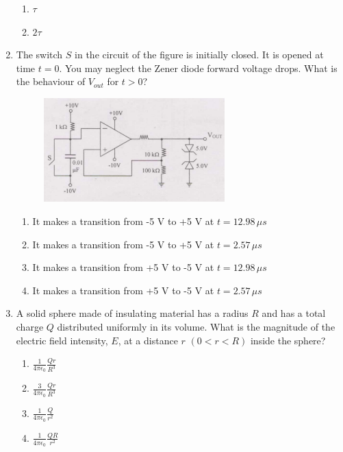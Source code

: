 \documentclass[journal]{IEEEtran}
\numberwithin{equation}{enumi}
\numberwithin{figure}{enumi}
\begin{document}
\begin{enumerate}
\begin{multicols}{4}
\begin{enumerate}
        \item $\tau$
        \item $2\tau$
    \end{enumerate}
    \end{multicols}
    \bigskip
    \item The switch $S$ in the circuit of the figure is initially closed. It is opened at time $t = 0$. You may neglect the Zener diode forward voltage drops. What is the behaviour of $V_{out}$ for $t > 0$?
    \begin{figure}[!ht]
    \centering
    \includegraphics[width=7cm]{figs/7.png}
    \caption{}
    \end{figure}
    \begin{enumerate}
        \item It makes a transition from -5 V to +5 V at $t = 12.98 \, \mu s$
        \item It makes a transition from -5 V to +5 V at $t = 2.57 \, \mu s$
        \item It makes a transition from +5 V to -5 V at $t = 12.98 \, \mu s$
        \item It makes a transition from +5 V to -5 V at $t = 2.57 \, \mu s$
    \end{enumerate}
    \bigskip
    \item A solid sphere made of insulating material has a radius $R$ and has a total charge $Q$ distributed uniformly in its volume. What is the magnitude of the electric field intensity, $E$, at a distance $r$ $(0 < r < R)$ inside the sphere?
    \begin{multicols}{4}
    \begin{enumerate}
        \item $\frac{1}{4 \pi \epsilon_0} \frac{Qr}{R^3}$
        \item $\frac{3}{4 \pi \epsilon_0} \frac{Qr}{R^3}$
        \item $\frac{1}{4 \pi \epsilon_0} \frac{Q}{r^2}$
        \item $\frac{1}{4 \pi \epsilon_0} \frac{QR}{r^2}$
   \end{enumerate}
   \end{multicols}

\end{enumerate}
\end{document}
